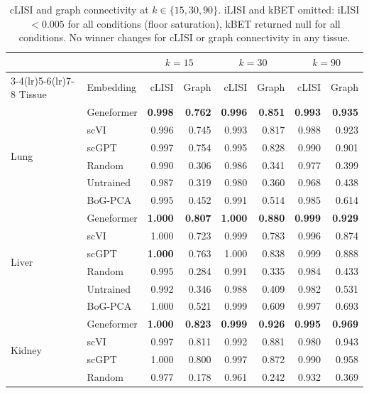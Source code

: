 \documentclass[11pt]{article}
\begin{document}
\begin{table}[h!]
\centering
\caption{cLISI and graph connectivity at $k \in \{15, 30, 90\}$. iLISI and kBET omitted: iLISI $< 0.005$ for all conditions (floor saturation), kBET returned null for all conditions. No winner changes for cLISI or graph connectivity in any tissue.}
\label{tab:app_knn}
\scriptsize
\begin{tabular}{@{}ll rr rr rr@{}}
\toprule
 & & \multicolumn{2}{c}{$k = 15$} & \multicolumn{2}{c}{$k = 30$} & \multicolumn{2}{c}{$k = 90$} \\
\cmidrule(lr){3-4}\cmidrule(lr){5-6}\cmidrule(lr){7-8}
Tissue & Embedding & cLISI & Graph & cLISI & Graph & cLISI & Graph \\
\midrule
\multirow{6}{*}{Lung}
 & Geneformer & \textbf{0.998} & \textbf{0.762} & \textbf{0.996} & \textbf{0.851} & \textbf{0.993} & \textbf{0.935} \\
 & scVI       & 0.996 & 0.745 & 0.993 & 0.817 & 0.988 & 0.923 \\
 & scGPT      & 0.997 & 0.754 & 0.995 & 0.828 & 0.990 & 0.901 \\
 & Random     & 0.990 & 0.306 & 0.986 & 0.341 & 0.977 & 0.399 \\
 & Untrained  & 0.987 & 0.319 & 0.980 & 0.360 & 0.968 & 0.438 \\
 & BoG-PCA    & 0.995 & 0.452 & 0.991 & 0.514 & 0.985 & 0.614 \\
\midrule
\multirow{6}{*}{Liver}
 & Geneformer & \textbf{1.000} & \textbf{0.807} & \textbf{1.000} & \textbf{0.880} & \textbf{0.999} & \textbf{0.929} \\
 & scVI       & 1.000 & 0.723 & 0.999 & 0.783 & 0.996 & 0.874 \\
 & scGPT      & \textbf{1.000} & 0.763 & 1.000 & 0.838 & 0.999 & 0.888 \\
 & Random     & 0.995 & 0.284 & 0.991 & 0.335 & 0.984 & 0.433 \\
 & Untrained  & 0.992 & 0.346 & 0.988 & 0.409 & 0.982 & 0.531 \\
 & BoG-PCA    & 1.000 & 0.521 & 0.999 & 0.609 & 0.997 & 0.693 \\
\midrule
\multirow{6}{*}{Kidney}
 & Geneformer & \textbf{1.000} & \textbf{0.823} & \textbf{0.999} & \textbf{0.926} & \textbf{0.995} & \textbf{0.969} \\
 & scVI       & 0.997 & 0.811 & 0.992 & 0.881 & 0.980 & 0.943 \\
 & scGPT      & 1.000 & 0.800 & 0.997 & 0.872 & 0.990 & 0.958 \\
 & Random     & 0.977 & 0.178 & 0.961 & 0.242 & 0.932 & 0.369 \\

\end{tabular}
\end{table}
\end{document}
